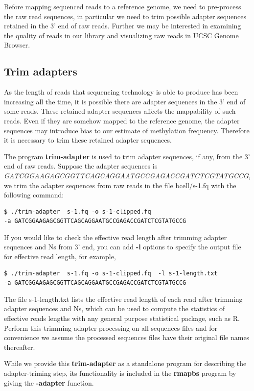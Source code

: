 \documentclass{article}
\begin{document}
Before mapping sequenced reads to a reference genome, we need to
pre-process the raw read sequences, in particular we need to trim
possible adapter sequences retained in the 3' end of raw
reads. Further we may be interested in examining the quality of reads
in our library and visualizing raw reads in UCSC Genome Browser. 

\subsection{Trim adapters}
\label{sec:trim-adapter}
As the length of reads that sequencing technology is able to produce
has been increasing all the time, it is possible there are adapter
sequences in the 3' end of some reads. These retained adapter
sequences affects the mappability of such reads. Even if they are
somehow mapped to the reference genome, the adapter sequences may
introduce bias to our estimate of methylation frequency. Therefore it
is necessary to trim these retained adapter sequences. 

The program \textbf{trim-adapter} is used to trim adapter sequences,
if any, from the 3' end of raw reads. Suppose the adapter sequences is
\textit{GATCGGAAGAGCGGTTCAGCAGGAATGCCGAGACCGATCTCGTATGCCG}, we trim
the adapter sequences from raw reads in the file bcell/s-1.fq with the
following command:
\begin{verbatim}
$ ./trim-adapter  s-1.fq -o s-1-clipped.fq  
-a GATCGGAAGAGCGGTTCAGCAGGAATGCCGAGACCGATCTCGTATGCCG  
\end{verbatim}

If you would like to check the effective read length after trimming
adapter sequences and Ns from 3' end, you can add \textbf{-l} options
to specify the output file for effective read length, for example,
\begin{verbatim}
$ ./trim-adapter  s-1.fq -o s-1-clipped.fq  -l s-1-length.txt
-a GATCGGAAGAGCGGTTCAGCAGGAATGCCGAGACCGATCTCGTATGCCG  
\end{verbatim}
The file s-1-length.txt lists the effective read length of each read
after trimming adapter sequences and Ns, which can be used to compute
the statistics of effective reads lengths with any general purpose
statistical package, such as R. Perform this trimming adapter
processing on all sequences files and for convenience we assume the
processed sequences files have their original file names thereafter.

While we provide this \textbf{trim-adapter} as a standalone program
for describing the adapter-triming step, its functionality is included
in the \textbf{rmapbs} program by giving the \textbf{-adapter}
function. 
\end{document}

